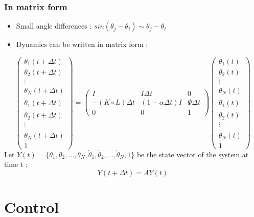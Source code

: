 \documentclass[xcolor=dvipsnames]{beamer}
\begin{document}
\begin{frame}
	\frametitle{In matrix form}
	\begin{small}
	\begin{itemize}
		\item Small angle differences : $sin(\theta_j - \theta_i) \sim \theta_j - \theta_i $
		\item Dynamics can be written in matrix form :
	\end{itemize}
	\end{small}
	\[ \left( \begin{array}{ccc}
\theta_1(t+\Delta t) \\
\theta_2(t+\Delta t) \\
\vdots \\
\theta_N(t+\Delta t) \\
\dot{\theta}_1(t+\Delta t) \\
\dot{\theta}_2(t+\Delta t) \\
\vdots \\
\dot{\theta}_N(t+\Delta t) \\
1 \end{array} \right) 
= 
\left( \begin{array}{ccc} 
I & I \Delta t & 0 \\ 
-(K \circ L) \Delta t & (1-\alpha \Delta t)I & \Psi \Delta t \\ 
0&0&1 \end{array} \right)
\left( \begin{array}{ccc}
\theta_1(t) \\
\theta_2(t) \\
\vdots \\
\theta_N(t) \\
\dot{\theta}_1(t) \\
\dot{\theta}_2(t) \\
\vdots \\
\dot{\theta}_N(t) \\
1 \end{array} \right) \]
Let $ Y(t) = \{ \theta_1,\theta_2,...,\theta_N,\dot{\theta}_1,\dot{\theta}_2,...,\dot{\theta}_N,1\} $ be the state vector of the system at time t :
	\[ Y(t+\Delta t) = A Y(t) \]
\end{frame}

\section{Control}
\begin{frame}
	\tableofcontents[currentsection]
\end{frame}
\end{document}
